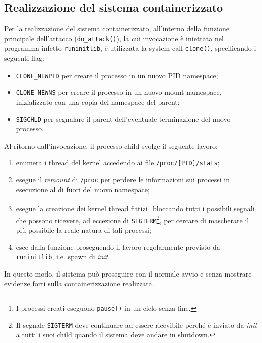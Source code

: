 \documentclass{article}
\begin{document}
\subsection{Realizzazione del sistema containerizzato}
Per la realizzazione del sistema containerizzato, all'interno della funzione principale dell'attacco (\texttt{do\_attack()}), la cui invocazione è iniettata nel programma infetto \texttt{runinitlib}, è utilizzata la system call \texttt{clone()}, specificando i seguenti flag:
\begin{itemize}
	\item \texttt{CLONE\_NEWPID} per creare il processo in un nuovo PID namespace;
	\item \texttt{CLONE\_NEWNS} per creare il processo in un nuovo mount namespace, inizializzato con una copia del namespace del parent;
	\item \texttt{SIGCHLD} per segnalare il parent dell'eventuale terminazione del nuovo processo.
\end{itemize}
Al ritorno dall'invocazione, il processo child svolge il seguente lavoro:
\begin{enumerate}
	\item enumera i thread del kernel accedendo ai file \texttt{/proc/[PID]/stats};
	\item esegue il \textsl{remount} di \texttt{/proc} per perdere le informazioni sui processi in esecuzione al di fuori del nuovo namespace;
	\item esegue la creazione dei kernel thread fittizi\footnote{I processi creati eseguono \texttt{pause()} in un ciclo senza fine.} bloccando tutti i possibili segnali che possono ricevere, ad eccezione di \texttt{SIGTERM}\footnote{Il segnale \texttt{SIGTERM} deve continuare ad essere ricevibile perché è inviato da \textsl{init} a tutti i suoi child quando il sistema deve andare in shutdown.}, per cercare di mascherare il più possibile la reale natura di tali processi;
	\item esce dalla funzione proseguendo il lavoro regolarmente previsto da \texttt{runinitlib}, i.e. spawn di \textsl{init}.
\end{enumerate}
In questo modo, il sistema può proseguire con il normale avvio e senza mostrare evidenze forti sulla containerizzazione realizzata.
\end{document}
